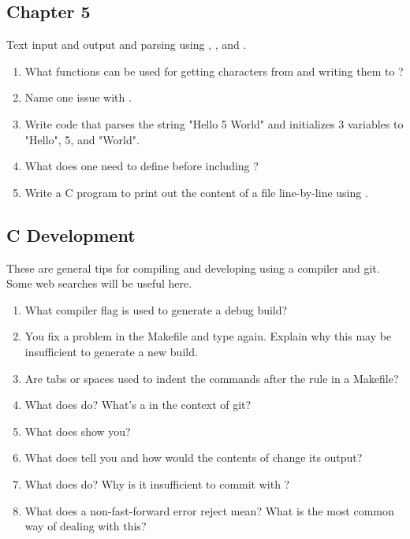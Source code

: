 \subsection{Chapter 5}

Text input and output and parsing using , , and .

\begin{enumerate}
\item What functions can be used for getting characters from  and writing them to ?
\item Name one issue with .
\item Write code that parses the string "Hello 5 World" and initializes 3 variables to "Hello", 5, and "World".
\item What does one need to define before including ?
\item Write a C program to print out the content of a file line-by-line using .
\end{enumerate}

\subsection{C Development}

These are general tips for compiling and developing using a compiler and git.
Some web searches will be useful here.

\begin{enumerate}
\item What compiler flag is used to generate a debug build?
\item You fix a problem in the Makefile and type  again.
Explain why this may be insufficient to generate a new build.
\item Are tabs or spaces used to indent the commands after the rule in a Makefile?
\item What does  do? What's a  in the context of git?
\item What does  show you?
\item What does  tell you and how would the contents of  change its output?
\item What does  do? Why is it insufficient to commit with ?
\item What does a non-fast-forward error  reject mean? What is the most common way of dealing with this?
\end{enumerate}


